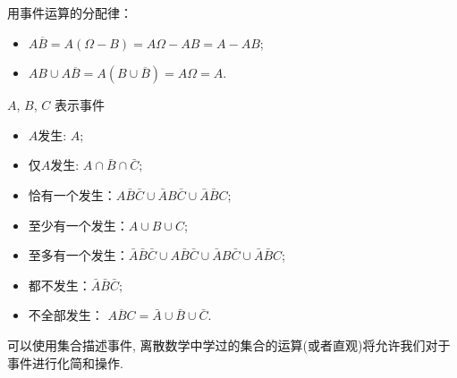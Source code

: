 \begin{solution}
    用事件运算的分配律：
    \begin{itemize}
        \item $A\overline{B}=A(\Omega-B)=A\Omega-AB=A-AB$;
        \item $AB\cup A\overline{B}=A(B\cup\overline{B})=A\Omega=A$.
    \end{itemize}
\end{solution}

\begin{example}
    $A$, $B$, $C$ 表示事件
    \begin{itemize}
        \item $A$发生: $A$;
        \item 仅$A$发生: $A\cap \bar{B}\cap \bar{C}$;
        \item 恰有一个发生：$A \bar B \bar C\cup \bar AB\bar C\cup \bar A\bar BC$;
        \item 至少有一个发生：$A\cup B\cup C$;
        \item 至多有一个发生：$\bar A\bar B\bar C\cup A \bar B \bar C \cup \bar AB\bar C\cup \bar A\bar BC$;
        \item 都不发生：$\bar A\bar B\bar C$;
        \item 不全部发生： $\overline{ABC}=\bar A\cup \bar B\cup \bar C$.
    \end{itemize}
\end{example}

\begin{takeaway}
{
    可以使用集合描述事件, 离散数学中学过的集合的运算(或者直观)将允许我们对于事件进行化简和操作.
}
\end{takeaway}